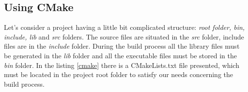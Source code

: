 \subsection {Using CMake}
Let's consider a project having a little bit complicated structure: \textit { root folder, bin, include, lib} and \textit { src} folders. The source files are situated in the \textit { src} folder, include files are in the \textit { include} folder. During the build process all the library files must be generated in the \textit { lib} folder and all the executable files must be stored in the \textit { bin} folder. In the listing \ref {cmake} there is a CMakeLists.txt file presented, which must be located in the project root folder to satisfy our needs concerning the build process.



